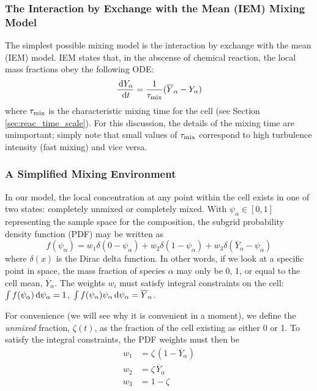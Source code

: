 \subsubsection{The Interaction by Exchange with the Mean (IEM) Mixing Model}

The simplest possible mixing model is the interaction by exchange with the mean (IEM) model.  IEM states that, in the abscense of chemical reaction, the local mass fractions obey the following ODE:
\begin{equation}\label{eq:iem}
\frac{\,\mathrm{d} Y_\alpha}{\,\mathrm{d} t} = \frac{1}{\tau_{\rm mix}}(\overline{Y}_\alpha - Y_\alpha)
\end{equation}
where $\tau_{\rm mix}$ is the characteristic mixing time for the cell (see Section \ref{sec:reac_time_scale}).  For this discussion, the details of the mixing time are unimportant; simply note that small values of $\tau_{\rm mix}$ correspond to high turbulence intensity (fast mixing) and vice versa.

\subsubsection{A Simplified Mixing Environment}

In our model, the local concentration at any point within the cell exists in one of two states: completely unmixed or completely mixed.  With $\psi_\alpha \in [0,1]$ representing the sample space for the composition, the subgrid probability density function (PDF) may be written as
\begin{equation}
\label{eq:pdf}
f(\psi_\alpha) = w_1 \delta(0-\psi_\alpha) + w_2 \delta(1-\psi_\alpha) + w_3 \delta(\overline{Y}_\alpha - \psi_\alpha)
\end{equation}
where $\delta(x)$ is the Dirac delta function.  In other words, if we look at a specific point in space, the mass fraction of species $\alpha$ may only be 0, 1, or equal to the cell mean, $\overline{Y}_\alpha$.  The weights $w_i$ must satisfy integral constraints on the cell: $\int f(\psi_\alpha) \,\mathrm{d} \psi_\alpha = 1$, $\int f(\psi_\alpha) \psi_\alpha \,\mathrm{d} \psi_\alpha = \overline{Y}_\alpha$.

For convenience (we will see why it is convenient in a moment), we define the \emph{unmixed} fraction, $\zeta(t)$, as the fraction of the cell existing as either 0 or 1.  To satisfy the integral constraints, the PDF weights must then be
\begin{align}
w_1 &= \zeta \, (1 - \overline{Y}_\alpha) \\
w_2 &= \zeta \, \overline{Y}_\alpha \\
w_3 &= 1-\zeta
\end{align}

